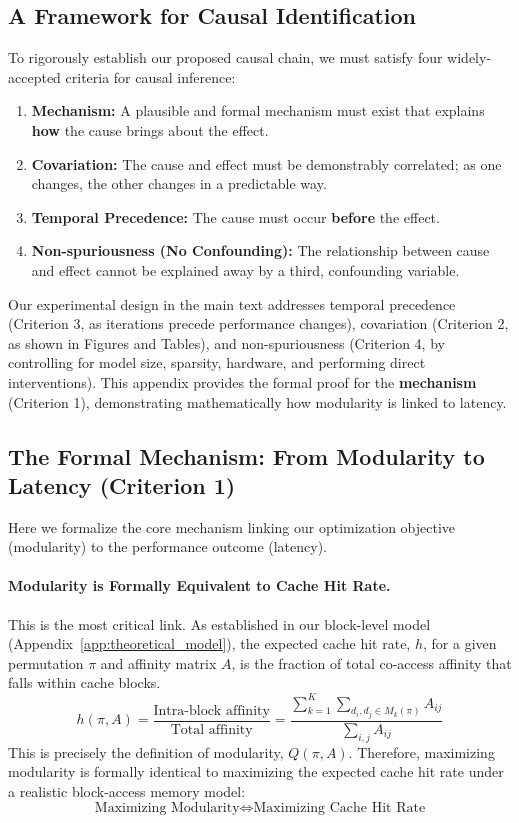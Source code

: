 \documentclass{article}
\begin{document}
\subsection{A Framework for Causal Identification}
To rigorously establish our proposed causal chain, we must satisfy four widely-accepted criteria for causal inference:
\begin{enumerate}
    \item \textbf{Mechanism:} A plausible and formal mechanism must exist that explains \textbf{how} the cause brings about the effect.
    \item \textbf{Covariation:} The cause and effect must be demonstrably correlated; as one changes, the other changes in a predictable way.
    \item \textbf{Temporal Precedence:} The cause must occur \textbf{before} the effect.
    \item \textbf{Non-spuriousness (No Confounding):} The relationship between cause and effect cannot be explained away by a third, confounding variable.
\end{enumerate}
Our experimental design in the main text addresses temporal precedence (Criterion 3, as iterations precede performance changes), covariation (Criterion 2, as shown in Figures and Tables), and non-spuriousness (Criterion 4, by controlling for model size, sparsity, hardware, and performing direct interventions). This appendix provides the formal proof for the \textbf{mechanism} (Criterion 1), demonstrating mathematically how modularity is linked to latency.

\subsection{The Formal Mechanism: From Modularity to Latency (Criterion 1)}
Here we formalize the core mechanism linking our optimization objective (modularity) to the performance outcome (latency).

\paragraph{Modularity is Formally Equivalent to Cache Hit Rate.} This is the most critical link. As established in our block-level model (Appendix~\ref{app:theoretical_model}), the expected cache hit rate, $h$, for a given permutation $\pi$ and affinity matrix $A$, is the fraction of total co-access affinity that falls within cache blocks.
\[
h(\pi, A) = \frac{\text{Intra-block affinity}}{\text{Total affinity}} = \frac{\sum_{k=1}^{K} \sum_{d_i, d_j \in M_k(\pi)} A_{ij}}{\sum_{i,j} A_{ij}}
\]
This is precisely the definition of modularity, $Q(\pi, A)$. Therefore, maximizing modularity is formally identical to maximizing the expected cache hit rate under a realistic block-access memory model:
\[
\text{Maximizing Modularity} \Leftrightarrow \text{Maximizing Cache Hit Rate}
\]
\end{document}
